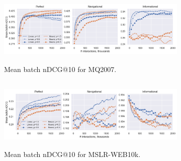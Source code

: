 \begin{figure}[t]
	\centering
	\begin{subfigure}{1\textwidth}
		\includegraphics[width=13cm, height=3.5cm]{images/RQ4/mq2007_foltr_online nDCG_both_c2000_ps.png}
		\caption{Mean batch nDCG@10 for MQ2007.}
		\label{fig:mq2007-rq4}
	\end{subfigure}
	\begin{subfigure}{1\textwidth}
		\includegraphics[width=13cm, height=3.5cm]{images/RQ4/mslr10k_foltr_online nDCG_both_c2000_ps.png}
		\caption{Mean batch nDCG@10 for MSLR-WEB10k.}
		\label{fig:mslr10k-rq4}
	\end{subfigure}
	\caption{{\color{red}{Results for RQ4: performance of FOLtR-ES in terms of online nDCG@10 computed using relevance labels and the SERPs used for obtaining user iterations (averaged across all dataset splits).}} \label{fig:RQ4}} 
\end{figure}

